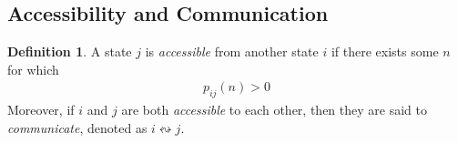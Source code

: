 \documentclass[a4paper,12pt]{article}
\theoremstyle{definition}
\newtheorem{definition}{Definition}[subsection]
\begin{document}
\subsection{Accessibility and Communication}

	\begin{definition}
		A state $j$ is \emph{accessible} from another state $i$ if there exists some $n$ for which
		\begin{equation*}
			\begin{aligned}
				p_{ij}(n) > 0
			\end{aligned}
			\end{equation*}
		Moreover, if $i$ and $j$ are both \emph{accessible} to each other, then they are said to \emph{communicate}, denoted as $i \leftrightsquigarrow j$.
	\end{definition}
	
\end{document}
